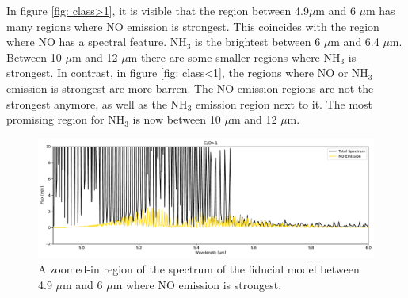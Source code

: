 \documentclass[oneside, single, authoryear, semicolon]{lion-msc}
\newcommand{\4}{$_4$}
\newcommand{\3}{$_3$}
\newcommand{\2}{$_2$}
\begin{document}
In figure \ref{fig: class>1}, it is visible that the region between 4.9$\mu$m and 6 $\mu$m has many regions where NO emission is strongest. This coincides with the region where NO has a spectral feature. NH\3 is the brightest between 6 $\mu$m and 6.4 $\mu$m. Between 10 $\mu$m and 12 $\mu$m there are some smaller regions where NH\3 is strongest. In contrast, in figure \ref{fig: class<1}, the regions where NO or NH\3 emission is strongest are more barren. The NO emission regions are not the strongest anymore, as well as the NH\3 emission region next to it. The most promising region for NH\3 is now between 10 $\mu$m and 12 $\mu$m. 

\begin{figure}[!ht]
    \centering
    \includegraphics[width=\linewidth]{Figures/NO_region.pdf}
    \caption{A zoomed-in region of the spectrum of the fiducial model between 4.9 $\mu$m and 6 $\mu$m where NO emission is strongest.}
    \label{fig: NO region}
\end{figure}
\end{document}
